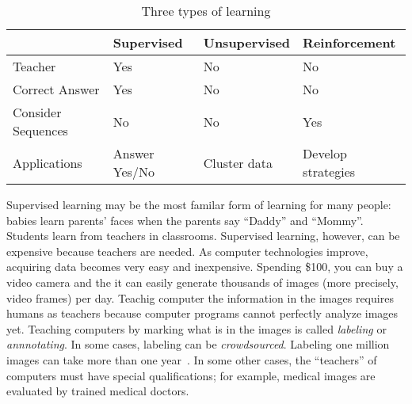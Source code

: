 \vspace{0.1in}
\begin{table}
  \begin{tabular}{p{1.2in}p{1.2in}p{1.2in}p{1.2in}}
    &    {\bf Supervised} & {\bf Unsupervised} & {\bf Reinforcement} \\
    \hline
    Teacher & Yes & No & No \\
    Correct Answer & Yes & No & No \\
    Consider Sequences & No & No & Yes \\
    Applications & Answer Yes/No & Cluster data & Develop strategies \\
  \end{tabular}
  \caption{Three types of learning}
  \label{table:threetypesoflearning}
\end{table}
\vspace{0.1in}

Supervised learning may be the most familar form of learning for many
people: babies learn parents' faces when the parents say ``Daddy'' and
``Mommy''.  Students learn from teachers in classrooms.  Supervised
learning, however, can be expensive because teachers are needed.  As
computer technologies improve, acquiring data becomes very easy and
inexpensive.  Spending \$100, you can buy a video camera and the it
can easily generate thousands of images (more precisely, video frames)
per day. Teachig computer the information in the images requires
humans as teachers because computer programs cannot perfectly analyze
images yet.  Teaching computers by marking what is in the images is
called {\it labeling} or {\it annnotating}.  In some cases, labeling
can be {\it crowdsourced}.  Labeling one million images can take more
than one year~\cite{imagenet}.   In some other
cases, the ``teachers'' of computers must have special qualifications;
for example, medical images are evaluated by trained medical doctors.

\begin{comment}
http://incompleteideas.net/book/bookdraft2017nov5.pdf
Reinforcement Learning: An Introduction
Richard S. Sutton and Andrew G. Barto
\end{comment}

